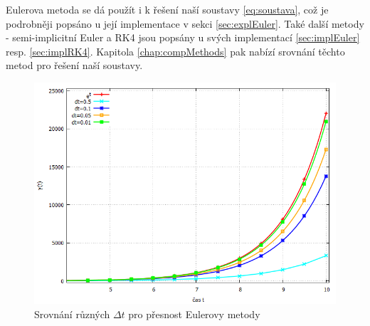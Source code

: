 Eulerova metoda se dá použít i k řešení naší soustavy \eqref{eq:soustava}, což je podrobněji popsáno u její implementace v sekci \ref{sec:explEuler}. Také další  metody - semi-implicitní Euler a RK4 jsou popsány u svých implementací \ref{sec:implEuler} resp. \ref{sec:implRK4}. Kapitola \ref{chap:compMethods} pak nabízí srovnání těchto metod pro řešení naší soustavy.

\begin{figure}[p]
	\caption{Srovnání různých $ \Delta t $ pro přesnost Eulerovy metody}
	\label{fig:euler}
	\centering
	\includegraphics[width=\linewidth]{Figs/eulerTable}
\end{figure}









